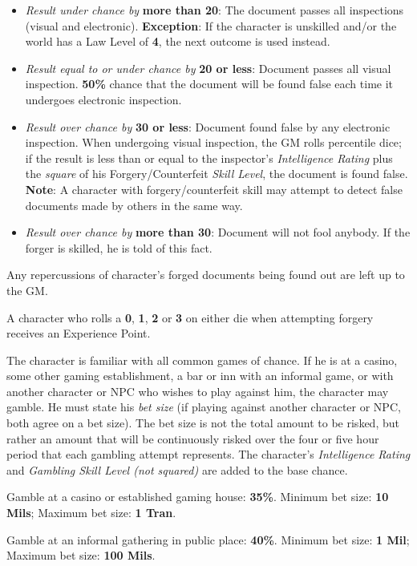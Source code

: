 \begin{itemize}
\item \emph{Result under chance by} \textbf{more than 20}: The
  document passes all inspections (visual and electronic).
  \textbf{Exception}: If the character is unskilled and/or the world
  has a Law Level of \textbf{4}, the next outcome is used instead.
\item \emph{Result equal to or under chance by} \textbf{20 or less}:
  Document passes all visual inspection.  \textbf{50\%} chance that
  the document will be found false each time it undergoes electronic
  inspection.
\item \emph{Result over chance by} \textbf{30 or less}: Document found
  false by any electronic inspection.  When undergoing visual
  inspection, the GM rolls percentile dice; if the result is less than
  or equal to the inspector's \emph{Intelligence Rating} plus the
  \emph{square} of his Forgery/Counterfeit \emph{Skill Level}, the
  document is found false.  \textbf{Note}: A character with
  forgery/counterfeit skill may attempt to detect false documents made
  by others in the same way.
\item \emph{Result over chance by} \textbf{more than 30}: Document
  will not fool anybody.  If the forger is skilled, he is told of this
  fact.
\end{itemize}

Any repercussions of character's forged documents being found out are
left up to the GM.

A character who rolls a \textbf{0}, \textbf{1}, \textbf{2} or
\textbf{3} on either die when attempting forgery receives an
Experience Point.

\label{sec:skill-gambling}

The character is familiar with all common games of chance.  If he is at
a casino, some other gaming establishment, a bar or inn with an
informal game, or with another character or NPC who wishes to play
against him, the character may gamble.  He must state his \emph{bet
  size} (if playing against another character or NPC, both agree on a
bet size).  The bet size is not the total amount to be risked, but
rather an amount that will be continuously risked over the four or
five hour period that each gambling attempt represents.  The
character's \emph{Intelligence Rating} and \emph{Gambling Skill Level
  (not squared)} are added to the base chance.

\begin{tasklist}
\item Gamble at a casino or established gaming house: \textbf{35\%}.
  Minimum bet size: \textbf{10 Mils}; Maximum bet size: \textbf{1
  Tran}.
\item Gamble at an informal gathering in public place: \textbf{40\%}.
  Minimum bet size: \textbf{1 Mil}; Maximum bet size: \textbf{100
    Mils}.
\end{tasklist}

